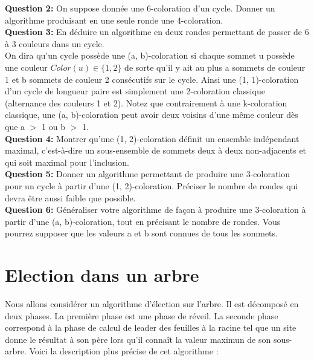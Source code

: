 \documentclass{article}[12pt]
\begin{document}
    \textbf{Question 2:} On suppose donnée une 6-coloration d'un cycle. Donner un algorithme produisant en une seule ronde une 4-coloration.\\
    
    \textbf{Question 3:} En déduire un algorithme en deux rondes permettant de passer de 6 à 3 couleurs dans un cycle.\\


On dira qu’un cycle possède une (a, b)-coloration si chaque sommet u possède une couleur $Color(u) \in \{1, 2\}$ de sorte qu’il y ait au plus a sommets de couleur 1 et b sommets de couleur 2 consécutifs sur le cycle. Ainsi une (1, 1)-coloration d’un cycle de longueur paire est simplement une
2-coloration classique (alternance des couleurs 1 et 2). Notez que contrairement à une k-coloration
classique, une (a, b)-coloration peut avoir deux voisins d’une même couleur dès que a $>$ 1 ou b $>$ 1.\\

\textbf{Question 4:} Montrer qu’une (1, 2)-coloration définit un ensemble indépendant maximal, c’est-à-dire un sous-ensemble de sommets deux à deux non-adjacents et qui soit maximal pour l’inclusion.\\

\textbf{Question 5:} Donner un algorithme permettant de produire une 3-coloration pour un cycle à partir
d’une (1, 2)-coloration. Préciser le nombre de rondes qui devra être aussi faible que possible.\\

\textbf{Question 6:} Généraliser votre algorithme de façon à produire une 3-coloration à partir d’une (a, b)-coloration, tout en précisant le nombre de rondes. Vous pourrez supposer que les valeurs a et b sont connues de tous les sommets.\\


\section{Election dans un arbre}

Nous allons considérer un algorithme d’élection sur l’arbre. Il est décomposé en deux phases.
La première phase est une phase de réveil. La seconde phase correspond à la phase de calcul de
leader des feuilles à la racine tel que un site donne le résultat à son père lors qu’il connaît la
valeur maximun de son sous-arbre. Voici la description plus précise de cet algorithme :
\end{document}
